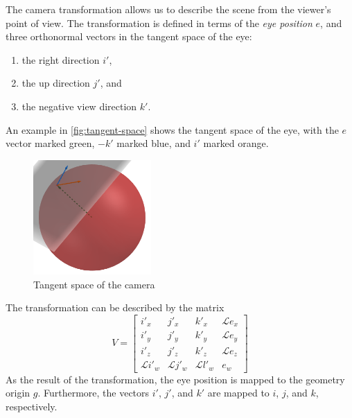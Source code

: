 The camera transformation allows us to describe the scene from the viewer's point of view.
The transformation is defined in terms of the \textit{eye position} $e$, and three orthonormal vectors in the tangent space of the eye:
\begin{enumerate}
    \item the right direction $i'$,
    \item the up direction $j'$, and
    \item the negative view direction $k'$.
\end{enumerate}
An example in \autoref{fig:tangent-space} shows the tangent space of the eye, with the $e$ vector marked green, $-k'$ marked blue, and $i'$ marked orange.\\
\begin{figure}[h]
    \centering
    \includegraphics[width=0.4\textwidth]{chapters/theoretical_foundations/sections/non-eudlidean-spaces/resources/tangent-space.png}
    \caption{Tangent space of the camera}
    \label{fig:tangent-space}
\end{figure}
The transformation can be described by the matrix
\begin{equation*}
    V =
    \begin{bmatrix}
        i'_x            & j'_x            & k'_x            & \mathcal{L}e_x \\
        i'_y            & j'_y            & k'_y            & \mathcal{L}e_y \\
        i'_z            & j'_z            & k'_z            & \mathcal{L}e_z \\
        \mathcal{L}i'_w & \mathcal{L}j'_w & \mathcal{L}l'_w & e_w
    \end{bmatrix}
\end{equation*}
As the result of the transformation, the eye position is mapped to the geometry origin $g$.
Furthermore, the vectors $i'$, $j'$, and $k'$ are mapped to $i$, $j$, and $k$, respectively.

